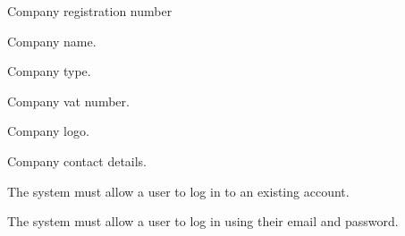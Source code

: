 \documentclass{article}
\begin{document}
\begin{list}{R.}{}
\begin{list}{R.}{}
\begin{list}{R..}{}
				\item Company registration number
				\item Company name.
				\item Company type.
				\item Company vat number.
				\item Company logo.
				\item Company contact details.
			\end{list} 
		\end{list}
		\item The system must allow a user to log in to an existing account.
		\begin{list}{R.}{}
			\item The system must allow a user to log in using their email and password.
		\end{list}
	\end{list}
	
\end{document}
